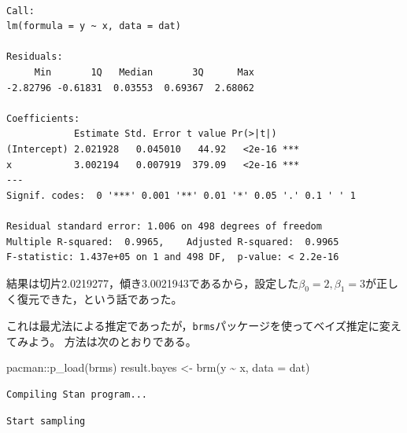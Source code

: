 \documentclass[
  a4paper,
]{ltjsbook}
\newenvironment{Shaded}{\begin{snugshade}}{\end{snugshade}}
\newcommand{\AttributeTok}[1]{\textcolor[rgb]{0.40,0.45,0.13}{#1}}
\newcommand{\FunctionTok}[1]{\textcolor[rgb]{0.28,0.35,0.67}{#1}}
\newcommand{\NormalTok}[1]{\textcolor[rgb]{0.00,0.23,0.31}{#1}}
\newcommand{\OtherTok}[1]{\textcolor[rgb]{0.00,0.23,0.31}{#1}}
\newcommand{\SpecialCharTok}[1]{\textcolor[rgb]{0.37,0.37,0.37}{#1}}
\begin{document}
\begin{verbatim}

Call:
lm(formula = y ~ x, data = dat)

Residuals:
     Min       1Q   Median       3Q      Max 
-2.82796 -0.61831  0.03553  0.69367  2.68062 

Coefficients:
            Estimate Std. Error t value Pr(>|t|)    
(Intercept) 2.021928   0.045010   44.92   <2e-16 ***
x           3.002194   0.007919  379.09   <2e-16 ***
---
Signif. codes:  0 '***' 0.001 '**' 0.01 '*' 0.05 '.' 0.1 ' ' 1

Residual standard error: 1.006 on 498 degrees of freedom
Multiple R-squared:  0.9965,    Adjusted R-squared:  0.9965 
F-statistic: 1.437e+05 on 1 and 498 DF,  p-value: < 2.2e-16
\end{verbatim}

結果は切片2.0219277，傾き3.0021943であるから，設定した\(\beta_0 = 2,\beta_1 = 3\)が正しく復元できた，という話であった。

これは最尤法による推定であったが，\texttt{brms}パッケージを使ってベイズ推定に変えてみよう。
方法は次のとおりである。

\begin{Shaded}
\begin{Highlighting}[]
\NormalTok{pacman}\SpecialCharTok{::}\FunctionTok{p\_load}\NormalTok{(brms)}
\NormalTok{result.bayes }\OtherTok{\textless{}{-}} \FunctionTok{brm}\NormalTok{(y }\SpecialCharTok{\textasciitilde{}}\NormalTok{ x, }\AttributeTok{data =}\NormalTok{ dat)}
\end{Highlighting}
\end{Shaded}

\begin{verbatim}
Compiling Stan program...
\end{verbatim}

\begin{verbatim}
Start sampling
\end{verbatim}
\end{document}
